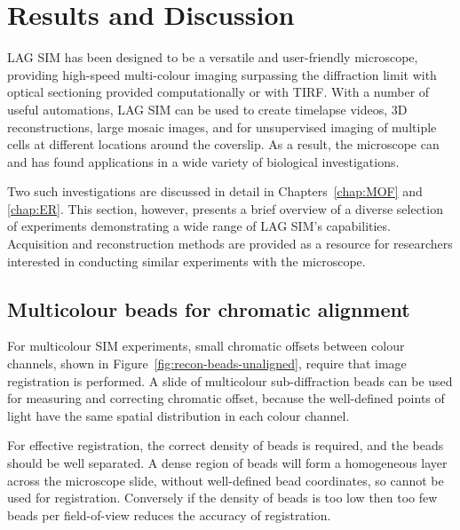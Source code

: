 \section{Results and Discussion} \label{sec:sim-showcase}
LAG SIM has been designed to be a versatile and user-friendly microscope, providing high-speed multi-colour imaging surpassing the diffraction limit with optical sectioning provided computationally or with TIRF. 
With a number of useful automations, LAG SIM can be used to create timelapse videos, 3D reconstructions, large mosaic images, and for unsupervised imaging of multiple cells at different locations around the coverslip. 
As a result, the microscope can and has found applications in a wide variety of biological investigations.

Two such investigations are discussed in detail in Chapters~\ref{chap:MOF} and \ref{chap:ER}. 
This section, however, presents a brief overview of a diverse selection of experiments demonstrating a wide range of LAG SIM's capabilities. 
Acquisition and reconstruction methods are provided as a resource for researchers interested in conducting similar experiments with the microscope. 

\subsection{Multicolour beads for chromatic alignment}
For multicolour SIM experiments, small chromatic offsets between colour channels, shown in Figure~\ref{fig:recon-beads-unaligned}, require that image registration is performed. 
A slide of multicolour sub-diffraction beads can be used for measuring and correcting chromatic offset, because the well-defined points of light have the same spatial distribution in each colour channel. 

For effective registration, the correct density of beads is required, and the beads should be well separated. 
A dense region of beads will form a homogeneous layer across the microscope slide, without well-defined bead coordinates, so cannot be used for registration. 
Conversely if the density of beads is too low then too few beads per field-of-view reduces the accuracy of registration. 

